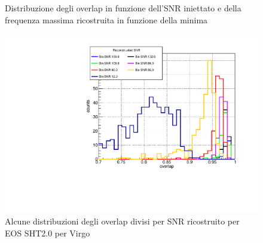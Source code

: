 \begin{figure}[hbt!]
	\centering
	\quad\quad\quad
	\caption{Distribuzione degli overlap in funzione dell'SNR iniettato e della frequenza massima ricostruita in funzione della minima}
	\label{fig:Overlap_problem}
\end{figure}
\begin{figure}
		\vspace{-35pt}
	\begin{center}
		\includegraphics[width=.30\textwidth]{figures/Capitolo_3/report/OverlapDistributionsALLDetector3SHT2_0spin1.pdf}
	\end{center}
		\vspace{-5pt}
	\caption{Alcune distribuzioni degli overlap divisi per SNR ricostruito per EOS SHT2.0 per Virgo}
	\label{fig:overlaps_histo}
		\vspace{-40pt}
\end{figure}
